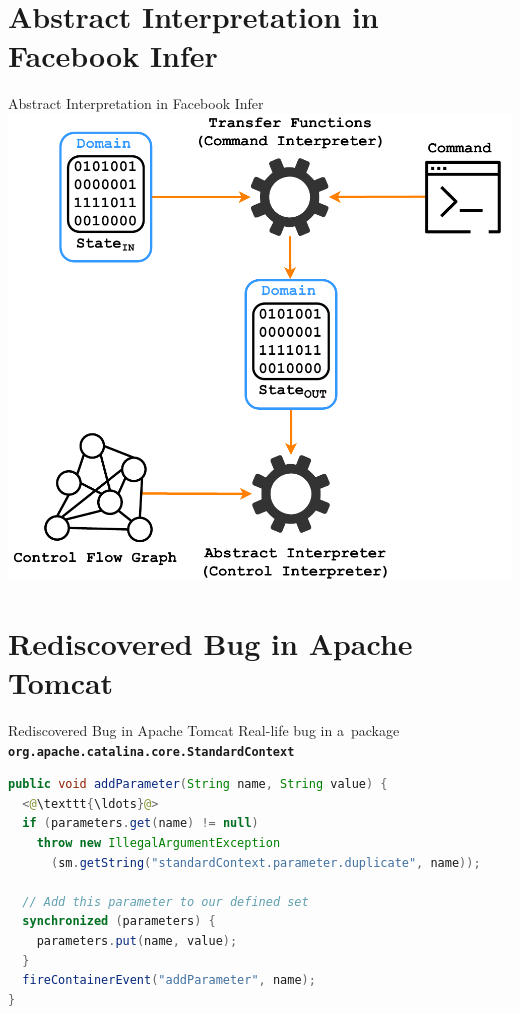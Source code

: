\documentclass[10pt, xcolor=pdflatex, hyperref={unicode}, aspectratio=169]{beamer}
\begin{document}
\section{Abstract Interpretation in Facebook Infer}
\begin{frame}{Abstract Interpretation in Facebook Infer}
    \centering
    \includegraphics[width=.58 \linewidth]{infer-analysis.pdf}
\end{frame}




\section{Rediscovered Bug in Apache Tomcat}
\begin{frame}[fragile]{Rediscovered Bug in Apache Tomcat}
    \alert{Real-life bug} in a~package \texttt{\textbf{org.apache.catalina.core.StandardContext}}

    \medskip

\begin{lstlisting}[language=java, morekeywords={String}]
public void addParameter(String name, String value) {
  <@\texttt{\ldots}@>
  if (parameters.get(name) != null)
    throw new IllegalArgumentException
      (sm.getString("standardContext.parameter.duplicate", name));

  // Add this parameter to our defined set
  synchronized (parameters) {
    parameters.put(name, value);
  }
  fireContainerEvent("addParameter", name);
}
\end{lstlisting}
\end{frame}


\end{document}
